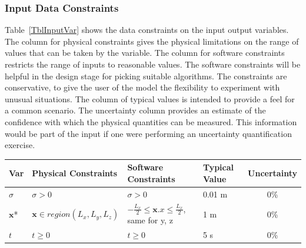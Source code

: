 \documentclass[12pt]{article}
\begin{document}



\subsubsection{Input Data Constraints} \label{sec_DataConstraints}    

Table~\ref{TblInputVar} shows the data constraints on the input output
variables.  The column for physical constraints gives the physical limitations
on the range of values that can be taken by the variable.  The column for
software constraints restricts the range of inputs to reasonable values.  The
software constraints will be helpful in the design stage for picking suitable
algorithms.  The constraints are conservative, to give the user of the model the
flexibility to experiment with unusual situations.  The column of typical values
is intended to provide a feel for a common scenario.  The uncertainty column
provides an estimate of the confidence with which the physical quantities can be
measured.  This information would be part of the input if one were performing an
uncertainty quantification exercise.


\begin{table}[!h]
  \caption{Input Variables} \label{TblInputVar}
  \renewcommand{\arraystretch}{1.2}
\noindent \begin{longtable*}{l l l l c} 
  \toprule
  \textbf{Var} & \textbf{Physical Constraints} & \textbf{Software Constraints} &
                             \textbf{Typical Value} & \textbf{Uncertainty}\\
  \midrule 
    $\sigma$ & $\sigma > 0$ & $\sigma > 0$ & 0.01 \si[per-mode=symbol] {\metre} & 0\%
  \\
    $\textbf{x}$* & $\textbf{x} \in region(L_x,L_y,L_z)$ & $-\frac{L_x}{2} \leq \textbf{x}.x \leq \frac{L_x}{2}$, same for y, z & 1 \si[per-mode=symbol] {\metre} & 0\%
  \\
    $t$ & $t \geq 0$ & $t \geq 0$ & 5 \si[per-mode=symbol] {\second} & 0\%
  \\
  \bottomrule
\end{longtable*}
\end{table}
\end{document}
